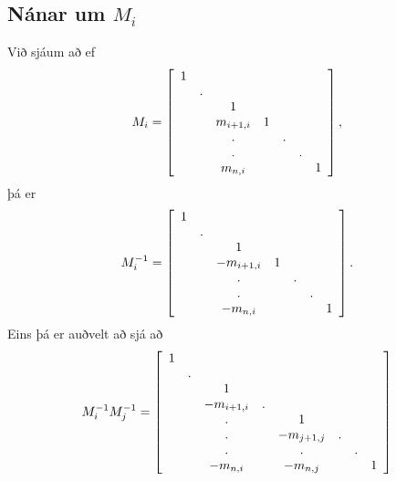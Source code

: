 \documentclass[letterpaper,10pt,icelandic]{sphinxmanual}
\begin{document}
\subsection{Nánar um \(M_i\)}
\label{kafli08:nanar-um}
Við sjáum að ef
\begin{gather}
\begin{split}M_i = \left[
\begin{array}{ccccccc}
1 &   &   &   &   &   &  \\
  & . &   &   &   &   &  \\
  &   & 1 &   &   &   &  \\
  &   & m_{i+1,i} & 1 &   &   &  \\
  &   & . &   & . &   &  \\
  &   & . &   &   & . &  \\
  &   & m_{n,i} &   &   &   & 1
\end{array}\right],\end{split}\notag
\end{gather}
þá er
\begin{gather}
\begin{split}M_i^{-1} = \left[
\begin{array}{ccccccc}
1 &   &   &   &   &   &  \\
  & . &   &   &   &   &  \\
  &   & 1 &   &   &   &  \\
  &   & -m_{i+1,i} & 1 &   &   &  \\
  &   & . &   & . &   &  \\
  &   & . &   &   & . &  \\
  &   & -m_{n,i} &   &   &   & 1
\end{array}\right].\end{split}\notag
\end{gather}
Eins þá er auðvelt að sjá að
\begin{gather}
\begin{split}M_i^{-1} M_j^{-1} = \left[
\begin{array}{cccccccc}
1 &   &   &   &   &   &   &  \\
  & . &   &   &   &   &   &  \\
  &   & 1 &   &   &   &   &  \\
  &   & -m_{i+1,i} & . &   &   &   &  \\
  &   & . &   & 1 &   &   &  \\
  &   & . &   & -m_{j+1,j} & . &   &  \\
  &   & . &   & . &   & . &  \\
  &   & -m_{n,i} &   & -m_{n,j} &   &   & 1
\end{array}
\right]\end{split}\notag
\end{gather}
\end{document}
